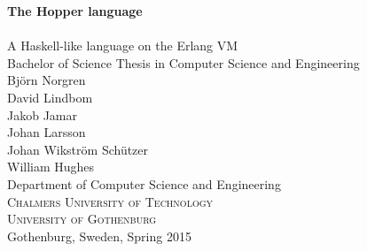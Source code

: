 
\begin{titlepage}
			
\addtolength{\voffset}{2cm}


\mbox{}
\vfill
\renewcommand{\familydefault}{\sfdefault} \normalfont %
\textbf{{\Huge	The Hopper language 	\\[0.2cm] 
				}} 	\\[0.5cm]
{\Large A Haskell-like language on the Erlang VM}\\[0.5cm]
Bachelor of Science Thesis in Computer Science and Engineering \\[0.5cm]

{\Large Björn Norgren}\\[2.0cm]
{\Large David Lindbom}\\[2.0cm]
{\Large Jakob Jamar}\\[2.0cm]
{\Large Johan Larsson}\\[2.0cm]
{\Large Johan Wikström Schützer}\\[2.0cm]
{\Large William Hughes}\\[2.0cm]


Department of Computer Science and Engineering \\
\textsc{Chalmers University of Technology} \\
\textsc{University of Gothenburg} \\
Gothenburg, Sweden, Spring 2015

\renewcommand{\familydefault}{\rmdefault} \normalfont %
\end{titlepage}


\newpage
\restoregeometry
\thispagestyle{empty}
\mbox{}


